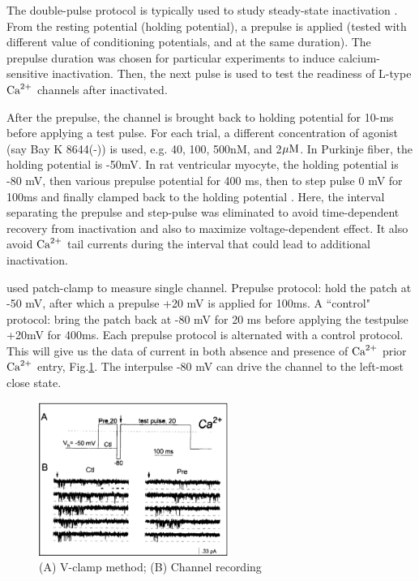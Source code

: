 \begin{framed}

The double-pulse protocol is typically used to study steady-state inactivation
\citep{hadley1987}. From the resting potential (holding potential), a prepulse
is applied (tested with different value of conditioning potentials, and at the same duration). The prepulse
duration was chosen for particular experiments to induce calcium-sensitive
inactivation. Then, the next pulse is used to test the readiness of L-type ${\text{Ca}^{2+}}$
channels after inactivated.

After the prepulse, the channel is brought back to holding potential for 10-ms
before applying a test pulse. For each trial, a different concentration of
agonist (say Bay K 8644(-)) is used, e.g. 40, 100, 500nM, and 2${\mu\text{M}}$. In
Purkinje fiber, the holding potential is -50mV. In rat ventricular myocyte, the
holding potential is -80 mV, then various prepulse potential for 400 ms, then to
step pulse 0 mV for 100ms and finally clamped back to the holding potential
\citep{sun2000mlc}. Here, the interval separating the prepulse and step-pulse
was eliminated to avoid time-dependent recovery from inactivation and also to
maximize voltage-dependent effect. It also avoid ${\text{Ca}^{2+}}$ tail currents during the
interval that could lead to additional inactivation.

\end{framed}

\citep{imredy1994mcs} used patch-clamp to measure single channel. Prepulse
protocol: hold the patch at -50 mV, after which a prepulse +20 mV is applied for
100ms. A ``control" protocol: bring the patch back at -80 mV for 20 ms before
applying the testpulse +20mV for 400ms. Each prepulse protocol is alternated
with a control protocol. This will give us the data of current in both absence
and presence of ${\text{Ca}^{2+}}$ prior ${\text{Ca}^{2+}}$ entry, Fig.\ref{fig:Imredy_Vclamp}. The
interpulse -80 mV can drive the channel to the left-most close state.

\begin{figure}[hbt]
  \centerline{\includegraphics[height=5cm,
    angle=0]{./images/Imredy_Vclamp.eps}}
  \caption{(A) V-clamp method; (B) Channel recording}
\label{fig:Imredy_Vclamp}
\end{figure}

